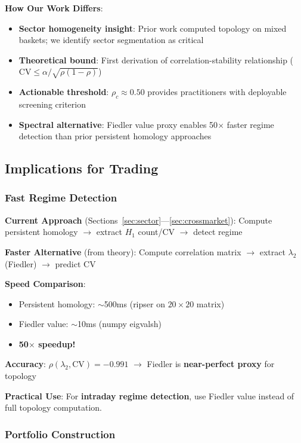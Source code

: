 \textbf{How Our Work Differs}:
\begin{itemize}
\item \checkmark \textbf{Sector homogeneity insight}: Prior work computed topology on mixed baskets; we identify sector segmentation as critical
\item \checkmark \textbf{Theoretical bound}: First derivation of correlation-stability relationship ($\text{CV} \leq \alpha/\sqrt{\rho(1-\rho)}$)
\item \checkmark \textbf{Actionable threshold}: $\rho_c \approx 0.50$ provides practitioners with deployable screening criterion
\item \checkmark \textbf{Spectral alternative}: Fiedler value proxy enables 50$\times$ faster regime detection than prior persistent homology approaches
\end{itemize}

\subsection{Implications for Trading}

\subsubsection{Fast Regime Detection}

\textbf{Current Approach} (Sections~\ref{sec:sector}---\ref{sec:crossmarket}): Compute persistent homology $\rightarrow$ extract $H_1$ count/CV $\rightarrow$ detect regime

\textbf{Faster Alternative} (from theory): Compute correlation matrix $\rightarrow$ extract $\lambda_2$ (Fiedler) $\rightarrow$ predict CV

\textbf{Speed Comparison}:
\begin{itemize}
\item Persistent homology: $\sim$500ms (ripser on $20\times 20$ matrix)
\item Fiedler value: $\sim$10ms (numpy eigvalsh)
\item \textbf{50$\times$ speedup!}
\end{itemize}

\textbf{Accuracy}: $\rho(\lambda_2, \text{CV}) = -0.991$ $\rightarrow$ Fiedler is \textbf{near-perfect proxy} for topology

\textbf{Practical Use}: For \textbf{intraday regime detection}, use Fiedler value instead of full topology computation.

\subsubsection{Portfolio Construction}

